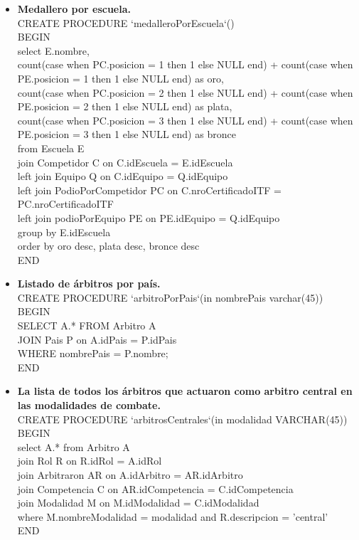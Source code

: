 \begin{itemize}
{    where C.nroCertificadoITF = certITF\;\\

END\\
}

\item{ \textbf{Medallero por escuela.}\\
CREATE PROCEDURE `medalleroPorEscuela`()\\
BEGIN\\
select E.nombre,\\
	count(case when PC.posicion = 1 then 1 else NULL end) + count(case when PE.posicion = 1 then 1 else NULL end) as oro, \\
	count(case when PC.posicion = 2 then 1 else NULL end) + count(case when PE.posicion = 2 then 1 else NULL end) as plata,  \\
    count(case when PC.posicion = 3 then 1 else NULL end) + count(case when PE.posicion = 3 then 1 else NULL end) as bronce\\
    from Escuela E\\
		join Competidor C on C.idEscuela = E.idEscuela\\
		left join Equipo Q on C.idEquipo = Q.idEquipo\\
		left join PodioPorCompetidor PC on C.nroCertificadoITF = PC.nroCertificadoITF\\
		left join podioPorEquipo PE on PE.idEquipo = Q.idEquipo\\
		
		group by E.idEscuela\\
		order by oro desc, plata desc, bronce desc\;\\
END\\
}

\item{\textbf{Listado de árbitros por país.}\\
CREATE PROCEDURE `arbitroPorPais`(in nombrePais varchar(45))\\
BEGIN\\
SELECT A.* FROM Arbitro A\\
	JOIN Pais P on A.idPais = P.idPais\\
    WHERE nombrePais = P.nombre;\\
END\\
}

\item{\textbf{La lista de todos los árbitros que actuaron como arbitro central en las modalidades de combate.}\\
CREATE PROCEDURE `arbitrosCentrales`(in modalidad VARCHAR(45))\\
BEGIN\\
select A.* from Arbitro A\\
	join Rol R on R.idRol = A.idRol\\
	join Arbitraron AR on A.idArbitro = AR.idArbitro\\
    join Competencia C on AR.idCompetencia = C.idCompetencia\\
    join Modalidad M on M.idModalidad = C.idModalidad\\
    where M.nombreModalidad = modalidad and R.descripcion = 'central'\;\\
END\\
}


\end{itemize}
